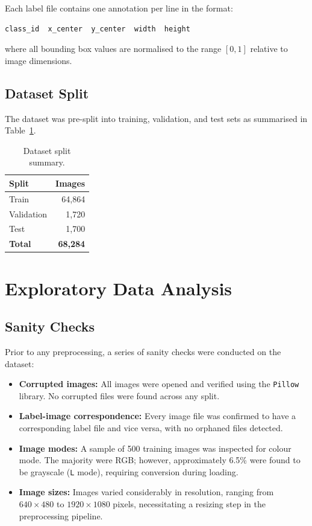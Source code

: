 \documentclass[12pt, a4paper]{article}
\begin{document}
Each label file contains one annotation per line in the format:

\begin{lstlisting}
class_id  x_center  y_center  width  height
\end{lstlisting}

where all bounding box values are normalised to the range $[0, 1]$ relative to image dimensions.

\subsection{Dataset Split}

The dataset was pre-split into training, validation, and test sets as summarised in Table~\ref{tab:splits}.

\begin{table}[H]
\centering
\begin{tabular}{lr}
\toprule
\textbf{Split} & \textbf{Images} \\
\midrule
Train & 64,864 \\
Validation & 1,720 \\
Test & 1,700 \\
\midrule
\textbf{Total} & \textbf{68,284} \\
\bottomrule
\end{tabular}
\caption{Dataset split summary.}
\label{tab:splits}
\end{table}

\section{Exploratory Data Analysis}

\subsection{Sanity Checks}

Prior to any preprocessing, a series of sanity checks were conducted on the dataset:

\begin{itemize}
    \item \textbf{Corrupted images:} All images were opened and verified using the \texttt{Pillow} library. No corrupted files were found across any split.
    \item \textbf{Label-image correspondence:} Every image file was confirmed to have a corresponding label file and vice versa, with no orphaned files detected.
    \item \textbf{Image modes:} A sample of 500 training images was inspected for colour mode. The majority were RGB; however, approximately 6.5\% were found to be grayscale (\texttt{L} mode), requiring conversion during loading.
    \item \textbf{Image sizes:} Images varied considerably in resolution, ranging from $640 \times 480$ to $1920 \times 1080$ pixels, necessitating a resizing step in the preprocessing pipeline.
\end{itemize}
\end{document}
